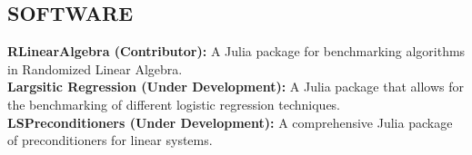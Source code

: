 \documentclass[margin,11pt]{res}
\begin{document}
\begin{resume}
\section{SOFTWARE}
\textbf{RLinearAlgebra (Contributor):} A Julia package for benchmarking algorithms in Randomized Linear Algebra.\\
\textbf{Largsitic Regression (Under Development):} A Julia package that allows for the benchmarking of different logistic regression techniques.\\
\textbf{LSPreconditioners (Under Development):} A comprehensive Julia package of preconditioners for linear systems.

\end{resume} 
\end{document}
